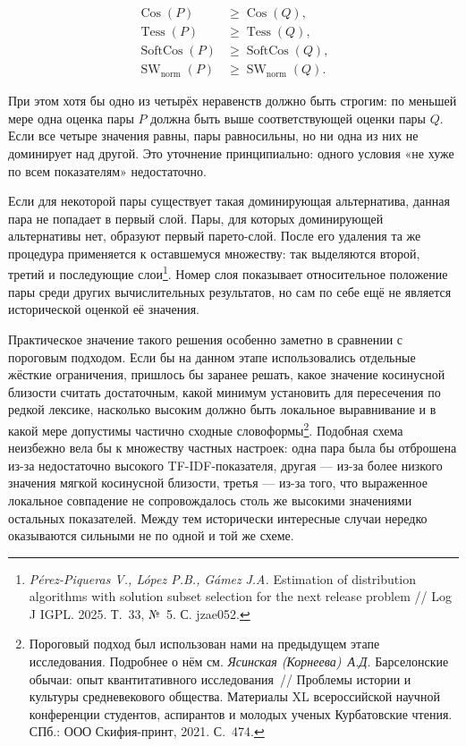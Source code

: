 \begin{equation}
\begin{aligned}
\operatorname{Cos}(P)&\geq\operatorname{Cos}(Q),\\
\operatorname{Tess}(P)&\geq\operatorname{Tess}(Q),\\
\operatorname{SoftCos}(P)&\geq\operatorname{SoftCos}(Q),\\
\operatorname{SW}_{\mathrm{norm}}(P)&\geq\operatorname{SW}_{\mathrm{norm}}(Q).
\end{aligned}
\end{equation}

При этом хотя бы одно из четырёх неравенств должно быть строгим: по меньшей мере одна оценка пары $P$ должна быть выше соответствующей оценки пары $Q$. Если все четыре значения равны, пары равносильны, но ни одна из них не доминирует над другой. Это уточнение принципиально: одного условия «не хуже по всем показателям» недостаточно.

Если для некоторой пары существует такая доминирующая альтернатива, данная пара не попадает в первый слой. Пары, для которых доминирующей альтернативы нет, образуют первый парето-слой. После его удаления та же процедура применяется к оставшемуся множеству: так выделяются второй, третий и последующие слои\footnote{\emph{Pérez-Piqueras V., López P}\emph{.}\emph{B., }\emph{Gámez}\emph{ J.A. }Estimation of distribution algorithms with solution subset selection for the next release problem // Log J IGPL. 2025. Т.~33, №~5. С. jzae052.}. Номер слоя показывает относительное положение пары среди других вычислительных результатов, но сам по себе ещё не является исторической оценкой её значения.

Практическое значение такого решения особенно заметно в сравнении с пороговым подходом. Если бы на данном этапе использовались отдельные жёсткие ограничения, пришлось бы заранее решать, какое значение косинусной близости считать достаточным, какой минимум установить для пересечения по редкой лексике, насколько высоким должно быть локальное выравнивание и в какой мере допустимы частично сходные словоформы\footnote{Пороговый подход был использован нами на предыдущем этапе исследования. Подробнее о нём см. \emph{Ясинская (Корнеева)~А.Д.} Барселонские обычаи: опыт квантитативного исследования~// Проблемы истории и культуры средневекового общества. Материалы XL всероссийской научной конференции студентов, аспирантов и молодых ученых Курбатовские чтения. СПб.: ООО Скифия-принт, 2021. С.~474.}. Подобная схема неизбежно вела бы к множеству частных настроек: одна пара была бы отброшена из-за недостаточно высокого TF-IDF-показателя, другая --- из-за более низкого значения мягкой косинусной близости, третья --- из-за того, что выраженное локальное совпадение не сопровождалось столь же высокими значениями остальных показателей. Между тем исторически интересные случаи нередко оказываются сильными не по одной и той же схеме.

